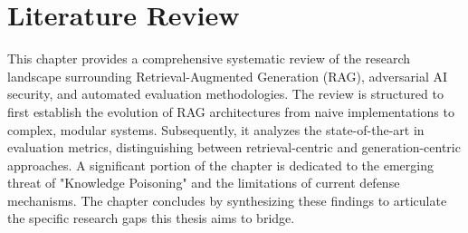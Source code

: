 





\chapter{Literature Review}
\label{ch3_literature_review}

This chapter provides a comprehensive systematic review of the research landscape surrounding Retrieval-Augmented Generation (RAG), adversarial AI security, and automated evaluation methodologies. The review is structured to first establish the evolution of RAG architectures from naive implementations to complex, modular systems. Subsequently, it analyzes the state-of-the-art in evaluation metrics, distinguishing between retrieval-centric and generation-centric approaches. A significant portion of the chapter is dedicated to the emerging threat of "Knowledge Poisoning" and the limitations of current defense mechanisms. The chapter concludes by synthesizing these findings to articulate the specific research gaps this thesis aims to bridge.

